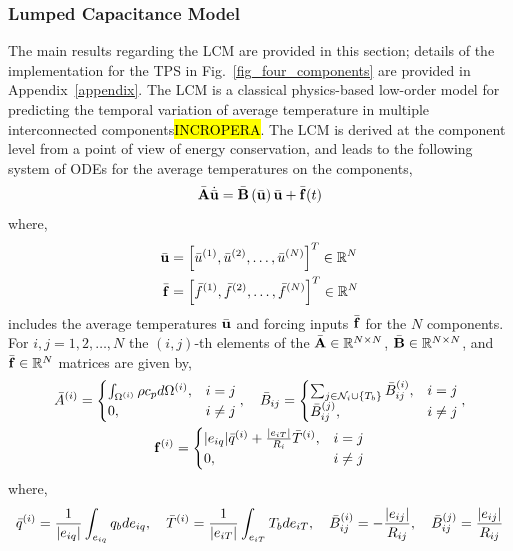 \subsubsection{Lumped Capacitance Model}
The main results regarding the LCM are provided in this section; details of the implementation for the TPS in Fig.~\ref{fig_four_components} are provided in Appendix~\ref{appendix}. The LCM is a classical physics-based low-order model for predicting the temporal variation of average temperature in multiple interconnected components\hl{INCROPERA}. The LCM is derived at the component level from a point of view of energy conservation, and leads to the following system of ODEs for the average temperatures on the components,
\begin{equation}
    \bar{\mathbf{A}}\dot{\bar{\mathbf{u}}} = \bar{\mathbf{B}}\left(\bar{\mathbf{u}}\right)\bar{\mathbf{u}} + \bar{\mathbf{f}}(t)\label{eqn_lcm}
\end{equation}
where,
\begin{subequations}
    \begin{align}
       \bar{\mathbf{u}} &= \left[\bar{u}^{(1)},\bar{u}^{(2)},\dots,\bar{u}^{(N)}\right]^T\in\mathbb{R}^{N}\\
        \bar{\mathbf{f}} &= \left[\bar{f}^{(1)},\bar{f}^{(2)},\dots,\bar{f}^{(N)}\right]^T\in\mathbb{R}^{N}
    \end{align}
\end{subequations}
includes the average temperatures $\bar{\mathbf{u}}$ and forcing inputs $\bar{\mathbf{f}}$ for the $N$ components. For $i,j=1,2,\dots,N$ the $(i,j)$-th elements of the $\bar{\mathbf{A}}\in\mathbb{R}^{N\times N}$, $\bar{\mathbf{B}}\in\mathbb{R}^{N\times N}$, and $\bar{\mathbf{f}}\in\mathbb{R}^{N}$ matrices are given by,
\begin{subequations}
    \begin{gather}
        \bar{A}^{(i)} = \begin{cases}
                \int_{\Omega^{(i)}}\rho c_p d\Omega^{(i)}, & i=j\\
                0, & i\neq j
            \end{cases},\quad \bar{B}_{ij} = \begin{cases}
            \sum_{j\in\mathcal{N}_i\cup\left\{T_b\right\}}\bar{B}^{(i)}_{ij}, &i=j \\
            \bar{B}^{(j)}_{ij}, & i\neq j
        \end{cases},\\ \mathbf{f}^{(i)} = \begin{cases}
            |e_{iq}|\bar{q}^{(i)} + \frac{|e_{iT}|}{R_{i}}\bar{T}^{(i)}, & i=j \\ 
            0, & i\neq j
        \end{cases}
    \end{gather}\label{eqn_lcm_matrices}
\end{subequations}
where,
\begin{equation}
    \bar{q}^{(i)} = \frac{1}{|e_{iq}|}\int_{e_{iq}} q_b de_{iq},\quad \bar{T}^{(i)} = \frac{1}{|e_{iT}|}\int_{e_{iT}}T_b de_{iT},\quad \bar{B}^{(i)}_{ij} = -\frac{|e_{ij}|}{R_{ij}},\quad \bar{B}_{ij}^{(j)} = \frac{|e_{ij}|}{R_{ij}}\label{eqn_lcm_matrices_elements}
\end{equation}

